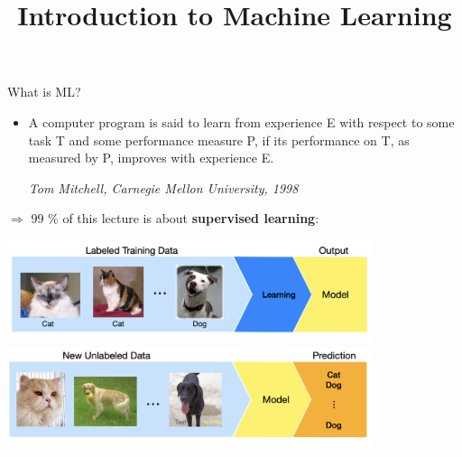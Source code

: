 \documentclass[11pt,compress,t,notes=noshow, xcolor=table]{beamer}
\title{Introduction to Machine Learning}
\date{}
\begin{document}
\sloppy


\begin{vbframe}{What is ML?}
\begin{itemize}
    \item \small A computer program is said to learn from experience E with respect to
  some task T and some performance measure P, if its performance on T, as 
  measured by P, improves with experience E. \\
  \begin{footnotesize}
  \emph{Tom Mitchell, Carnegie Mellon University, 1998}
  \end{footnotesize}
\end{itemize}


\small $\Rightarrow$ 99 $\%$ of this lecture is about \textbf{supervised learning}: 

\begin{center}
  \includegraphics[width = 0.8\textwidth]{slides/ml-basics/figure_man/nutshell-ml-basics-catdog-learning.png} 
  \includegraphics[width = 0.8\textwidth]{slides/ml-basics/figure_man/nutshell-ml-basics-catdog-prediction.png} 
\end{center}

\end{vbframe}
\end{document}
